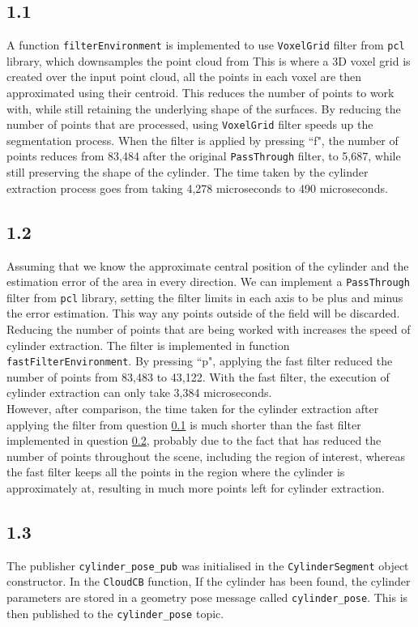 \documentclass[a4paper,12pt]{article}
\begin{document}
\subsection{1.1} \label{sec:1.1}
A function \texttt{filterEnvironment} is implemented to use \texttt{VoxelGrid} filter from \texttt{pcl} library, which downsamples the point cloud from  This is where a 3D voxel grid is created over the input point cloud, all the points in each voxel are then approximated using their centroid. This reduces the number of points to work with, while still retaining the underlying shape of the surfaces. By reducing the number of points that are processed, using \texttt{VoxelGrid} filter speeds up the segmentation process. When the filter is applied by pressing ``f", the number of points reduces from 83,484 after the original \texttt{PassThrough} filter, to 5,687, while still preserving the shape of the cylinder. The time taken by the cylinder extraction process goes from taking 4,278 microseconds to 490 microseconds. 

\subsection{1.2} \label{sec:1.2}
Assuming that we know the approximate central position of the cylinder and the estimation error of the area in every direction. We can implement a \texttt{PassThrough} filter from \texttt{pcl} library, setting the filter limits in each axis to be plus and minus the error estimation. This way any points outside of the field will be discarded. Reducing the number of points that are being worked with increases the speed of cylinder extraction. The filter is implemented in function \texttt{fastFilterEnvironment}. By pressing ``p", applying the fast filter reduced the number of points from 83,483 to 43,122. With the fast filter, the execution of cylinder extraction can only take 3,384 microseconds. \\

However, after comparison, the time taken for the cylinder extraction after applying the filter from question \ref{sec:1.1} is much shorter than the fast filter implemented in question \ref{sec:1.2}, probably due to the fact that  has reduced the number of points throughout the scene, including the region of interest, whereas the fast filter keeps all the points in the region where the cylinder is approximately at, resulting in much more points left for cylinder extraction.

\subsection{1.3}
The publisher \texttt{cylinder\_pose\_pub} was initialised in the \texttt{CylinderSegment} object constructor. In the \texttt{CloudCB} function, If the cylinder has been found, the cylinder parameters are stored in a geometry pose message called \texttt{cylinder\_pose}. This is then published to the \texttt{cylinder\_pose} topic.
\end{document}
